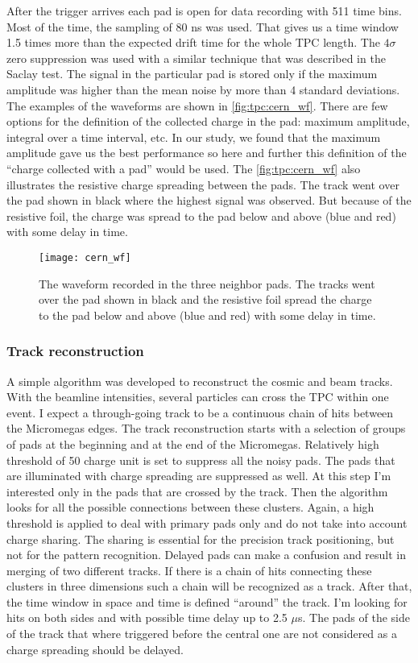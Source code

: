 \documentclass[../main.tex]{subfiles}
\begin{document}
After the trigger arrives each pad is open for data recording with 511 time bins. Most of the time, the sampling of 80 ns was used. That gives us a time window 1.5 times more than the expected drift time for the whole TPC length. The $4\sigma$ zero suppression was used with a similar technique that was described in the Saclay test. The signal in the particular pad is stored only if the maximum amplitude was higher than the mean noise by more than 4 standard deviations. The examples of the waveforms are shown in \autoref{fig:tpc:cern_wf}. There are few options for the definition of the collected charge in the pad: maximum amplitude, integral over a time interval, etc. In our study, we found that the maximum amplitude gave us the best performance so here and further this definition of the ``charge collected with a pad'' would be used. The \autoref{fig:tpc:cern_wf} also illustrates the resistive charge spreading between the pads. The track went over the pad shown in black where the highest signal was observed. But because of the resistive foil, the charge was spread to the pad below and above (blue and red) with some delay in time.

\begin{figure}[!ht]
   \centering
   \texttt{[image: cern\_wf]}
   \caption{The waveform recorded in the three neighbor pads. The tracks went over the pad shown in black and the resistive foil spread the charge to the pad below and above (blue and red) with some delay in time.}
   \label{fig:tpc:cern_wf}
 \end{figure}

\subsubsection{Track reconstruction}
A simple algorithm was developed to reconstruct the cosmic and beam tracks. With the beamline intensities, several particles can cross the TPC within one event. I expect a through-going track to be a continuous chain of hits between the Micromegas edges. The track reconstruction starts with a selection of groups of pads at the beginning and at the end of the Micromegas. Relatively high threshold of 50 charge unit is set to suppress all the noisy pads. The pads that are illuminated with charge spreading are suppressed as well. At this step I'm interested only in the pads that are crossed by the track. Then the algorithm looks for all the possible connections between these clusters. Again, a high threshold is applied to deal with primary pads only and do not take into account charge sharing. The sharing is essential for the precision track positioning, but not for the pattern recognition. Delayed pads can make a confusion and result in merging of two different tracks. If there is a chain of hits connecting these clusters in three dimensions such a chain will be recognized as a track. After that, the time window in space and time is defined ``around'' the track. I'm looking for hits on both sides and with possible time delay up to 2.5 $\mu$s. The pads of the side of the track that where triggered before the central one are not considered as a charge spreading should be delayed.
\end{document}
